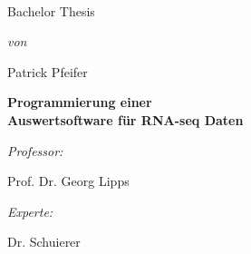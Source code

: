 \begin{titlepage}
\thispagestyle{plain}
\setlength\parindent{0pt}
\begin{center}
~

\vspace{1cm}
	{ \LARGE Bachelor Thesis \par }

\vspace{2cm}
	{ \large \emph{von} \par }
	Patrick Pfeifer

\vspace{3cm}
	{ \sffamily\LARGE \bfseries
	Programmierung einer\\ Auswertsoftware für RNA-seq Daten \par }

\vspace{6cm}
	\begin{minipage}{0.5\textwidth}
	\begin{flushleft}
		{ \large \emph{Professor:} \par }
		Prof. Dr. Georg Lipps
	\end{flushleft}
	\end{minipage}%
	\begin{minipage}{0.5\textwidth}
	\begin{flushright}
		{ \large \emph{Experte:} \par }
		Dr. Schuierer
	\end{flushright}
	\end{minipage}

\end{center}
\end{titlepage}

